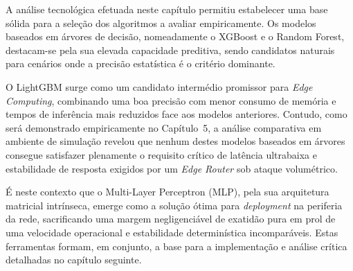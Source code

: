 A análise tecnológica efetuada neste capítulo permitiu estabelecer uma base
sólida para a seleção dos algoritmos a avaliar empiricamente. Os modelos
baseados em árvores de decisão, nomeadamente o XGBoost e o Random Forest,
destacam-se pela sua elevada capacidade preditiva, sendo candidatos naturais
para cenários onde a precisão estatística é o critério dominante.

O LightGBM surge como um candidato intermédio promissor para \textit{Edge
Computing}, combinando uma boa precisão com menor consumo de memória e
tempos de inferência mais reduzidos face aos modelos anteriores. Contudo,
como será demonstrado empiricamente no Capítulo~5, a análise comparativa
em ambiente de simulação revelou que nenhum destes modelos baseados em
árvores consegue satisfazer plenamente o requisito crítico de latência
ultrabaixa e estabilidade de resposta exigidos por um \textit{Edge Router}
sob ataque volumétrico.

É neste contexto que o Multi-Layer Perceptron (MLP), pela sua arquitetura
matricial intrínseca, emerge como a solução ótima para \textit{deployment}
na periferia da rede, sacrificando uma margem negligenciável de exatidão
pura em prol de uma velocidade operacional e estabilidade determinística
incomparáveis. Estas ferramentas formam, em conjunto, a base para a
implementação e análise crítica detalhadas no capítulo seguinte.